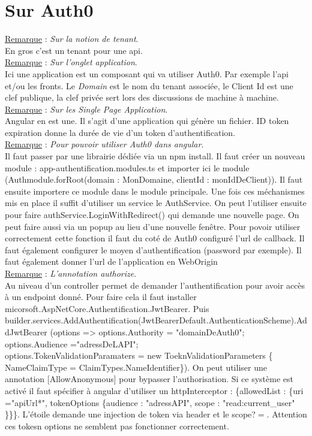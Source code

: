 \documentclass[a4paper,12pt,twoside]{article}
\newcommand{\rem}[2]{\noindent\underline{Remarque} : \textit{#1}.\\ \indent #2}
\begin{document}
\section{Sur Auth0}

\rem{Sur la notion de tenant}{En gros c'est un tenant pour une api.}\\

\rem{Sur l'onglet application}{Ici une application est un composant qui va utiliser Auth0. Par exemple l'api et/ou les fronts. Le \textit{Domain} est le nom du tenant associée, le Client Id est une clef publique, la clef privée sert lors des discussions de machine à machine.}\\

\rem{Sur les Single Page Application}{Angular en est une. Il s'agit d'une application qui génère un fichier. ID token expiration donne la durée de vie d'un token d'authentification.}\\

\rem{Pour pouvoir utiliser Auth0 dans angular}{Il faut passer par une librairie dédiée via un npm install. Il faut créer un nouveau module : app-authentification.modules.ts et importer ici le module (Authmodule.forRoot(domain : MonDomaine, clientId : monIdDeClient)). Il faut ensuite importere ce module dans le module principale. Une fois ces méchanismes mis en place il suffit d'utiliser un service le AuthService. On peut l'utiliser ensuite pour faire authService.LoginWithRedirect() qui demande une nouvelle page. On peut faire aussi via un popup au lieu d'une nouvelle fenêtre. Pour povoir utiliser correctement cette fonction il faut du coté de Auth0 configuré l'url de callback. Il faut également configurer le moyen d'authentification (password par exemple). Il faut également donner l'url de l'application en WebOrigin}\\

\rem{L'annotation authorize}{Au niveau d'un controller permet de demander l'authentification pour avoir accès à un endpoint donné. Pour faire cela il faut installer micorsoft.AspNetCore.Authentification.JwtBearer. Puis builder.services.AddAuthentification(JwtBearerDefault.AuthenticationScheme).AddJwtBearer (options => options.Authority = "domainDeAuth0"; options.Audience ="adressDeLAPI"; \\ options.TokenValidationParamaters = new ToeknValidationParameters \{ NameClaimType = ClaimTypes.NameIdentifier\}). On peut utiliser une annotation [AllowAnonymous] pour bypasser l'authorisation. Si ce système est activé il faut spécifier à angular d'utiliser un httpInterceptor : \{allowedList : \{uri ="apiUrl*", tokenOptions \{audience : "adressAPI", scope : "read:current\_user" \}\}\}. L'étoile demande une injection de token via header et le scope?$=$. Attention ces tokesn options ne semblent pas fonctionner correctement. }\\
\end{document}
